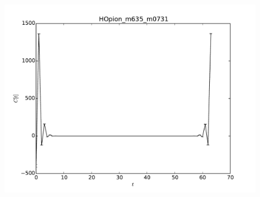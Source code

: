 \documentclass[11pt,a4paper]{article}
\begin{document}
  \begin{figure}[h]
 \centering
 \includegraphics[width=\textwidth]{HOpion_m635_m0731.pdf}
 \caption{}
 \end{figure}
 
 \clearpage
\end{document}

